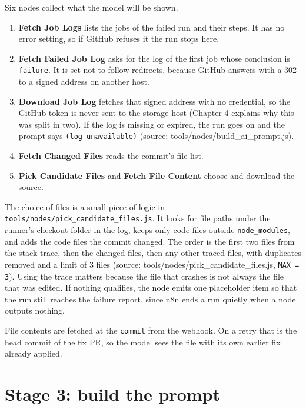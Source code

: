 \documentclass[11pt,a4paper]{report}
\begin{document}
Six nodes collect what the model will be shown.

\begin{enumerate}[leftmargin=*,itemsep=2pt]
\item \textbf{Fetch Job Logs} lists the jobs of the failed run and their steps. It has no error setting, so if GitHub refuses it the run stops here.
\item \textbf{Fetch Failed Job Log} asks for the log of the first job whose conclusion is \texttt{failure}. It is set not to follow redirects, because GitHub answers with a 302 to a signed address on another host.
\item \textbf{Download Job Log} fetches that signed address with no credential, so the GitHub token is never sent to the storage host (Chapter 4 explains why this was split in two). If the log is missing or expired, the run goes on and the prompt says \texttt{(log unavailable)} (source: tools/nodes/build\_ai\_prompt.js).
\item \textbf{Fetch Changed Files} reads the commit's file list.
\item \textbf{Pick Candidate Files} and \textbf{Fetch File Content} choose and download the source.
\end{enumerate}

The choice of files is a small piece of logic in \texttt{tools/\allowbreak{}nodes/\allowbreak{}pick\_\allowbreak{}candidate\_\allowbreak{}files.\allowbreak{}js}. It looks for file paths under the runner's checkout folder in the log, keeps only code files outside \texttt{node\_\allowbreak{}modules}, and adds the code files the commit changed. The order is the first two files from the stack trace, then the changed files, then any other traced files, with duplicates removed and a limit of 3 files (source: tools/nodes/pick\_candidate\_files.js, \texttt{MAX = 3}). Using the trace matters because the file that crashes is not always the file that was edited. If nothing qualifies, the node emits one placeholder item so that the run still reaches the failure report, since n8n ends a run quietly when a node outputs nothing.

File contents are fetched at the \texttt{commit} from the webhook. On a retry that is the head commit of the fix PR, so the model sees the file with its own earlier fix already applied.

\section{Stage 3: build the prompt}
\end{document}
